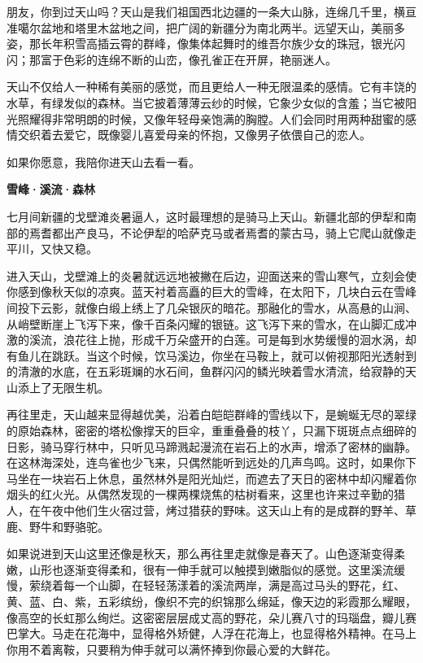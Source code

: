 \documentclass[12pt,UTF-8,openany]{ctexbook}
\begin{document}
\begin{normalsize}
    
    朋友，你到过天山吗？天山是我们祖国西北边疆的一条大山脉，连绵几千里，横亘准噶尔盆地和塔里木盆地之间，把广阔的新疆分为南北两半。远望天山，美丽多姿，那长年积雪高插云霄的群峰，像集体起舞时的维吾尔族少女的珠冠，银光闪闪；那富于色彩的连绵不断的山峦，像孔雀正在开屏，艳丽迷人。
    
    天山不仅给人一种稀有美丽的感觉，而且更给人一种无限温柔的感情。它有丰饶的水草，有绿发似的森林。当它披着薄薄云纱的时候，它象少女似的含羞；当它被阳光照耀得非常明朗的时候，又像年轻母亲饱满的胸膛。人们会同时用两种甜蜜的感情交织着去爱它，既像婴儿喜爱母亲的怀抱，又像男子依偎自己的恋人。
    
    如果你愿意，我陪你进天山去看一看。
    
    \begin{center}
    
    \begin{large}\textbf{雪峰·溪流·森林}\end{large}
    
    \end{center}
    
    七月间新疆的戈壁滩炎暑逼人，这时最理想的是骑马上天山。新疆北部的伊犁和南部的焉耆都出产良马，不论伊犁的哈萨克马或者焉耆的蒙古马，骑上它爬山就像走平川，又快又稳。
    
    进入天山，戈壁滩上的炎暑就远远地被撇在后边，迎面送来的雪山寒气，立刻会使你感到像秋天似的凉爽。蓝天衬着高矗的巨大的雪峰，在太阳下，几块白云在雪峰间投下云影，就像白缎上绣上了几朵银灰的暗花。那融化的雪水，从高悬的山涧、从峭壁断崖上飞泻下来，像千百条闪耀的银链。这飞泻下来的雪水，在山脚汇成冲激的溪流，浪花往上抛，形成千万朵盛开的白莲。可是每到水势缓慢的洄水涡，却有鱼儿在跳跃。当这个时候，饮马溪边，你坐在马鞍上，就可以俯视那阳光透射到的清澈的水底，在五彩斑斓的水石间，鱼群闪闪的鳞光映着雪水清流，给寂静的天山添上了无限生机。
    
    再往里走，天山越来显得越优美，沿着白皑皑群峰的雪线以下，是蜿蜒无尽的翠绿的原始森林，密密的塔松像撑天的巨伞，重重叠叠的枝丫，只漏下斑斑点点细碎的日影，骑马穿行林中，只听见马蹄溅起漫流在岩石上的水声，增添了密林的幽静。在这林海深处，连鸟雀也少飞来，只偶然能听到远处的几声鸟鸣。这时，如果你下马坐在一块岩石上休息，虽然林外是阳光灿烂，而遮去了天日的密林中却闪耀着你烟头的红火光。从偶然发现的一棵两棵烧焦的枯树看来，这里也许来过辛勤的猎人，在午夜中他们生火宿过营，烤过猎获的野味。这天山上有的是成群的野羊、草鹿、野牛和野骆驼。
    
    如果说进到天山这里还像是秋天，那么再往里走就像是春天了。山色逐渐变得柔嫩，山形也逐渐变得柔和，很有一伸手就可以触摸到嫩脂似的感觉。这里溪流缓慢，萦绕着每一个山脚，在轻轻荡漾着的溪流两岸，满是高过马头的野花，红、黄、蓝、白、紫，五彩缤纷，像织不完的织锦那么绵延，像天边的彩霞那么耀眼，像高空的长虹那么绚烂。这密密层层成丈高的野花，朵儿赛八寸的玛瑙盘，瓣儿赛巴掌大。马走在花海中，显得格外矫健，人浮在花海上，也显得格外精神。在马上你用不着离鞍，只要稍为伸手就可以满怀捧到你最心爱的大鲜花。
    

\end{normalsize}
\end{document}
